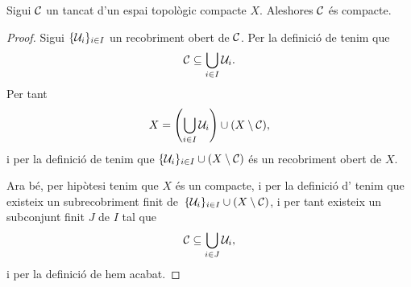 \documentclass[../Apunts.tex]{subfiles}
\begin{document}
	\begin{theorem}
		\label{thm:un tancat en un compacte és compacte}
		Sigui \(\mathcal{C}\) un tancat d'un espai topològic compacte \(X\). Aleshores \(\mathcal{C}\) és compacte.
		\begin{proof}
			Sigui \(\{\mathcal{U}_{i}\}_{i\in I}\) un recobriment obert de \(\mathcal{C}\). Per la definició de  tenim que
			\[\mathcal{C}\subseteq\bigcup_{i\in I}\mathcal{U}_{i}.\]
			Per tant %
			\[X=\left(\bigcup_{i\in I}\obert{U}_{i}\right)\cup(X\setminus\tancat{C}),\]
			i per la definició de  tenim que \(\{\mathcal{U}_{i}\}_{i\in I}\cup(X\setminus\mathcal{C})\) és un recobriment obert de \(X\).
			
			Ara bé, per hipòtesi tenim que \(X\) és un compacte, i per la definició d' tenim que existeix un subrecobriment finit de~\(\{\mathcal{U}_{i}\}_{i\in I}\cup(X\setminus\mathcal{C})\), i per tant existeix un subconjunt finit \(J\) de \(I\) tal que
			\[\mathcal{C}\subseteq\bigcup_{i\in J}\mathcal{U}_{i},\]
			i per la definició de  hem acabat.
		\end{proof}
	\end{theorem}
\end{document}
